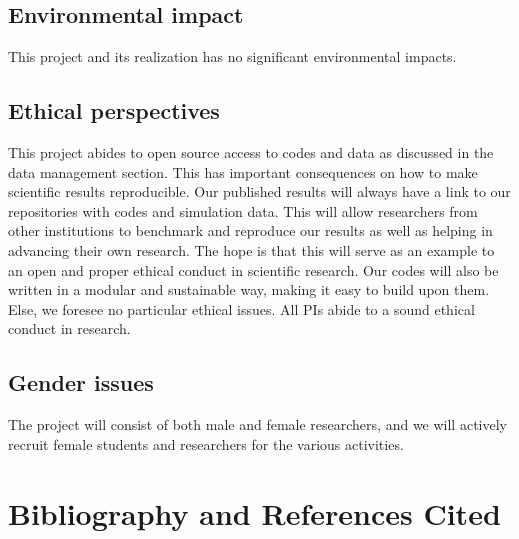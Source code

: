 \documentclass[10pt]{article}
\begin{document}
\subsection{Environmental impact}

This project and its realization has no  significant environmental impacts.

\subsection{Ethical perspectives}

This project abides to open source access to codes and data as discussed in the data management section. This has important consequences on how to make scientific results reproducible. Our published results will always have a link to our repositories with codes and simulation data. This will allow researchers from other institutions to benchmark and reproduce our results as well as helping in advancing their own 
research. The hope is that this will serve as an example to an open and proper ethical conduct in scientific research.  Our codes will also be written in a modular and sustainable way, making it easy to build upon them. 
Else, we foresee no particular ethical issues. All PIs abide to a sound ethical conduct in research.

\subsection{Gender issues}


The project will consist of both male and female researchers, and we
will actively recruit female students and researchers for the various activities. 

\section{Bibliography and References Cited}


\end{document}
